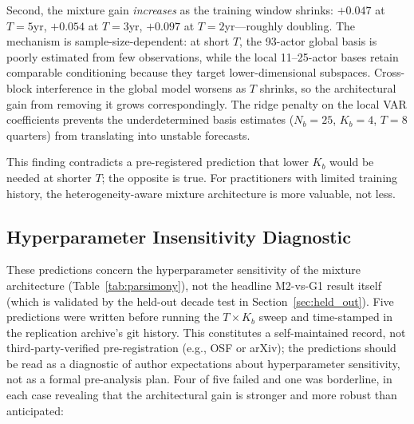 \documentclass[11pt,a4paper]{article}
\begin{document}
Second, the mixture gain \emph{increases} as the training window shrinks: $+0.047$ at $T{=}5$yr, $+0.054$ at $T{=}3$yr, $+0.097$ at $T{=}2$yr---roughly doubling. The mechanism is sample-size-dependent: at short $T$, the 93-actor global basis is poorly estimated from few observations, while the local 11--25-actor bases retain comparable conditioning because they target lower-dimensional subspaces. Cross-block interference in the global model worsens as $T$ shrinks, so the architectural gain from removing it grows correspondingly. The ridge penalty on the local VAR coefficients prevents the underdetermined basis estimates ($N_b{=}25$, $K_b{=}4$, $T{=}8$ quarters) from translating into unstable forecasts.

This finding contradicts a pre-registered prediction that lower $K_b$ would be needed at shorter $T$; the opposite is true. For practitioners with limited training history, the heterogeneity-aware mixture architecture is more valuable, not less.

\subsection{Hyperparameter Insensitivity Diagnostic}
\label{sec:prereg}

These predictions concern the hyperparameter sensitivity of the mixture architecture (Table~\ref{tab:parsimony}), not the headline M2-vs-G1 result itself (which is validated by the held-out decade test in Section~\ref{sec:held_out}). Five predictions were written before running the $T \times K_b$ sweep and time-stamped in the replication archive's git history. This constitutes a self-maintained record, not third-party-verified pre-registration (e.g., OSF or arXiv); the predictions should be read as a diagnostic of author expectations about hyperparameter sensitivity, not as a formal pre-analysis plan. Four of five failed and one was borderline, in each case revealing that the architectural gain is stronger and more robust than anticipated:
\end{document}
